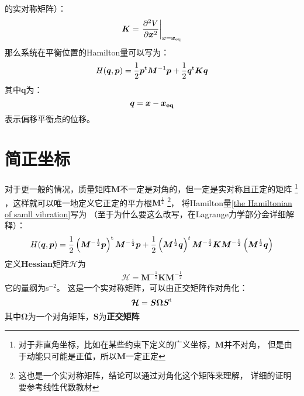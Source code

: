     的实对称矩阵）：
    \begin{equation}
        \bm{K} = \left.\frac{\partial{^2V}}{\partial{\bm{x}^2}}\right|_{\bm{x} = \bm{x}_{\mathrm{eq}}}
        \label{potential matrix}
    \end{equation}
    那么系统在平衡位置的Hamilton量可以写为：
    \begin{equation}
        H(\bm{q}, \bm{p}) = \frac{1}{2}\bm{p}^{\mathrm{t}}\bm{M}^{-1}\bm{p} + \frac{1}{2}\bm{q}^{\mathrm{t}}\bm{K}\bm{q}
        \label{the Hamiltonian of samll vibration}
    \end{equation}
    其中$\bm{q}$为：
    \begin{equation}
        \bm{q} = \bm{x} - \bm{x_{\mathrm{eq}}}
    \end{equation}
    表示偏移平衡点的位移。

    \section{简正坐标}
    对于更一般的情况，质量矩阵$\bm{M}$不一定是对角的，但一定是实对称且正定的矩阵
    \footnote{对于非直角坐标，比如在某些约束下定义的广义坐标，$\bm{M}$并不对角，
    但是由于动能只可能是正值，所以$\bm{M}$一定正定}
    ，这样就可以唯一地定义它正定的平方根$\bm{M}^{\frac{1}{2}}$
    \footnote{这也是一个实对称矩阵，结论可以通过对角化这个矩阵来理解，
    详细的证明要参考线性代数教材}，
    将Hamilton量\ref{the Hamiltonian of samll vibration}写为
    （至于为什么要这么改写，在Lagrange力学部分会详细解释）：
    \begin{equation}
        H(\bm{q},\bm{p}) = \frac{1}{2}\left(\bm{M}^{-\frac{1}{2}}\bm{p}\right)^{\mathrm{t}}\bm{M}^{-\frac{1}{2}}\bm{p} + 
        \frac{1}{2}\left(\bm{M}^{\frac{1}{2}}\bm{q}\right)^{t}\bm{M}^{-\frac{1}{2}}\bm{K}\bm{M}^{-\frac{1}{2}}\left(\bm{M}^{\frac{1}{2}}\bm{q}\right)
    \end{equation}
    定义\textbf{Hessian}矩阵$\bm{\mathcal{H}}$为 
    \begin{equation}
        \begin{split}
            \bm{\mathcal{H}} = \bm{M}^{-\frac{1}{2}}\bm{K}\bm{M}^{-\frac{1}{2}}
        \end{split}
        \label{Hessian matrix}
    \end{equation}
    它的量纲为s$^{-2}$。 这是一个实对称矩阵，可以由正交矩阵作对角化：
    \begin{equation}
        \bm{\mathcal{H}} = \bm{S}\bm{\bm{\Omega}S}^{\mathrm{t}}
    \end{equation}
    其中$\bm{\Omega}$为一个对角矩阵，$\bm{S}$为\textbf{正交矩阵}
